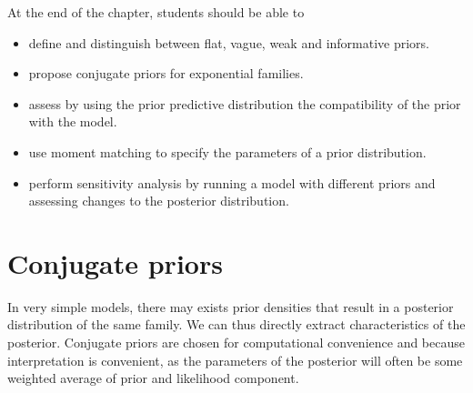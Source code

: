 \documentclass[
  11pt,
  letterpaper,
]{scrbook}
\providecommand{\tightlist}{%
  \setlength{\itemsep}{0pt}\setlength{\parskip}{0pt}}
\theoremstyle{definition}
\theoremstyle{plain}
\theoremstyle{plain}
\theoremstyle{plain}
\theoremstyle{definition}
\theoremstyle{definition}
\theoremstyle{plain}
\theoremstyle{plain}
\theoremstyle{remark}
\begin{document}
\begin{tcolorbox}[enhanced jigsaw, arc=.35mm, bottomrule=.15mm, bottomtitle=1mm, breakable, colback=white, colbacktitle=quarto-callout-important-color!10!white, colframe=quarto-callout-important-color-frame, coltitle=black, left=2mm, leftrule=.75mm, opacityback=0, opacitybacktitle=0.6, rightrule=.15mm, title=\textcolor{quarto-callout-important-color}{\faExclamation}\hspace{0.5em}{\textbf{Learning objectives}:}, titlerule=0mm, toprule=.15mm, toptitle=1mm]

At the end of the chapter, students should be able to

\begin{itemize}
\tightlist
\item
  define and distinguish between flat, vague, weak and informative
  priors.
\item
  propose conjugate priors for exponential families.
\item
  assess by using the prior predictive distribution the compatibility of
  the prior with the model.
\item
  use moment matching to specify the parameters of a prior distribution.
\item
  perform sensitivity analysis by running a model with different priors
  and assessing changes to the posterior distribution.
\end{itemize}

\end{tcolorbox}

\section{Conjugate priors}\label{conjugate-priors}

In very simple models, there may exists prior densities that result in a
posterior distribution of the same family. We can thus directly extract
characteristics of the posterior. Conjugate priors are chosen for
computational convenience and because interpretation is convenient, as
the parameters of the posterior will often be some weighted average of
prior and likelihood component.
\end{document}
